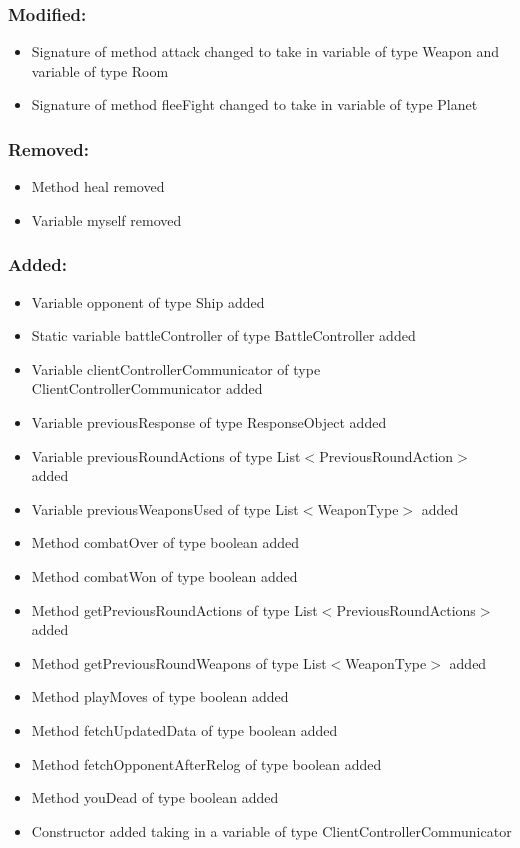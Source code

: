\documentclass{article}
\begin{document}
\subsubsection{Modified:}
\begin{itemize}
\item Signature of method attack changed to take in variable of type Weapon and variable of type Room
\item Signature of method fleeFight changed to take in variable of type Planet
\end{itemize}

\subsubsection{Removed:}
\begin{itemize}
\item Method heal removed
\item Variable myself removed
\end{itemize}

\subsubsection{Added:}
\begin{itemize}
\item Variable opponent of type Ship added
\item Static variable battleController of type BattleController added
\item Variable clientControllerCommunicator of type ClientControllerCommunicator added
\item Variable previousResponse of type ResponseObject added
\item Variable previousRoundActions of type List$<$PreviousRoundAction$>$ added
\item Variable previousWeaponsUsed of type List$<$WeaponType$>$ added
\item Method combatOver of type boolean added
\item Method combatWon of type boolean added
\item Method getPreviousRoundActions of type List$<$PreviousRoundActions$>$ added
\item Method getPreviousRoundWeapons of type List$<$WeaponType$>$ added
\item Method playMoves of type boolean added
\item Method fetchUpdatedData of type boolean added
\item Method fetchOpponentAfterRelog of type boolean added
\item Method youDead of type boolean added
\item Constructor added taking in a variable of type ClientControllerCommunicator
\end{itemize}
\end{document}
